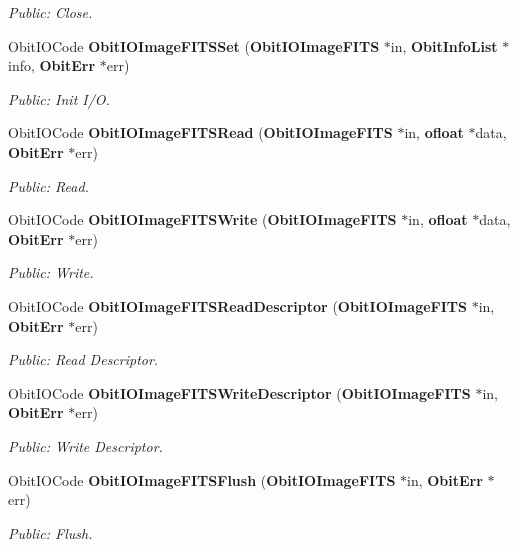 \begin{CompactItemize}
\begin{CompactList}\small\item\em Public: Close. \item\end{CompactList}\item 
Obit\-IOCode {\bf Obit\-IOImage\-FITSSet} ({\bf Obit\-IOImage\-FITS} $\ast$in, {\bf Obit\-Info\-List} $\ast$info, {\bf Obit\-Err} $\ast$err)
\begin{CompactList}\small\item\em Public: Init I/O. \item\end{CompactList}\item 
Obit\-IOCode {\bf Obit\-IOImage\-FITSRead} ({\bf Obit\-IOImage\-FITS} $\ast$in, {\bf ofloat} $\ast$data, {\bf Obit\-Err} $\ast$err)
\begin{CompactList}\small\item\em Public: Read. \item\end{CompactList}\item 
Obit\-IOCode {\bf Obit\-IOImage\-FITSWrite} ({\bf Obit\-IOImage\-FITS} $\ast$in, {\bf ofloat} $\ast$data, {\bf Obit\-Err} $\ast$err)
\begin{CompactList}\small\item\em Public: Write. \item\end{CompactList}\item 
Obit\-IOCode {\bf Obit\-IOImage\-FITSRead\-Descriptor} ({\bf Obit\-IOImage\-FITS} $\ast$in, {\bf Obit\-Err} $\ast$err)
\begin{CompactList}\small\item\em Public: Read Descriptor. \item\end{CompactList}\item 
Obit\-IOCode {\bf Obit\-IOImage\-FITSWrite\-Descriptor} ({\bf Obit\-IOImage\-FITS} $\ast$in, {\bf Obit\-Err} $\ast$err)
\begin{CompactList}\small\item\em Public: Write Descriptor. \item\end{CompactList}\item 
Obit\-IOCode {\bf Obit\-IOImage\-FITSFlush} ({\bf Obit\-IOImage\-FITS} $\ast$in, {\bf Obit\-Err} $\ast$err)
\begin{CompactList}\small\item\em Public: Flush. \item\end{CompactList}\item 

\end{CompactItemize}
